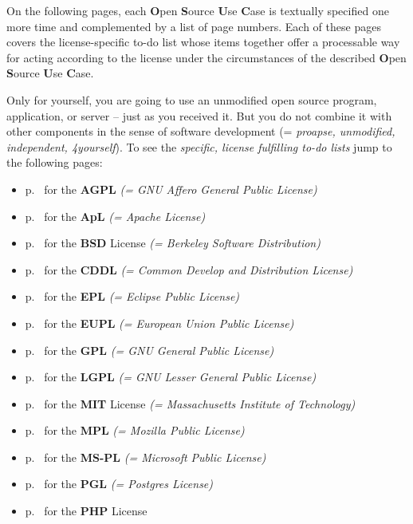On the following pages, each \textbf{O}pen \textbf{S}ource \textbf{U}se
\textbf{C}ase is textually specified one more time and complemented by a list of
page numbers. Each of these pages covers the license-specific to-do list whose
items together offer a processable way for acting according to the license under
the circumstances of the described \textbf{O}pen \textbf{S}ource \textbf{U}se
\textbf{C}ase.

\begin{description}
\label{OSUCList}
\item[OSUC-01:]\label{OSUC-01-DEF}
Only for yourself, you are going to use an unmodified open source program,
application, or server -- just as you received it. But you do not combine it
with other components in the sense of software development (= \textit{proapse,
unmodified, independent, 4yourself}).
To see the \textit{specific, license fulfilling to-do lists} jump to the
following pages:
  \begin{itemize}
    \item p.\ \pageref{OSUC-01-AGPL} for the \textbf{AGPL}
      \textit{(= GNU Affero General Public License)} 
    \item p.\ \pageref{OSUC-01-Apache20} for the \textbf{ApL}
      \textit{(= Apache License)}
    \item p.\ \pageref{OSUC-01-BSD} for the \textbf{BSD} License
      \textit{(= Berkeley Software Distribution)}
    \item p.\ \pageref{OSUC-01-CDDL} for the \textbf{CDDL}
      \textit{(= Common Develop and Distribution License)}  
    \item p.\ \pageref{OSUC-01-EPL} for the \textbf{EPL}
      \textit{(= Eclipse Public License)}     
    \item p.\ \pageref{OSUC-01-EUPL} for the \textbf{EUPL}
      \textit{(= European Union Public License)} 
    \item p.\ \pageref{OSUC-01-GPL} for the \textbf{GPL}
       \textit{(= GNU General Public License)} 
    \item p.\ \pageref{OSUC-01-LGPL} for the \textbf{LGPL}
      \textit{(= GNU Lesser General Public License)}           
    \item p.\ \pageref{OSUC-01-MIT} for the \textbf{MIT} License
       \textit{(= Massachusetts Institute of Technology)} 
    \item p.\ \pageref{OSUC-01-MPL} for the \textbf{MPL}
      \textit{(= Mozilla Public License)}     
    \item p.\ \pageref{OSUC-01-MS-PL} for the \textbf{MS-PL}
      \textit{(= Microsoft Public License)} 
    \item p.\ \pageref{OSUC-01-PGL} for the \textbf{PGL}
      \textit{(= Postgres License)} 
    \item p.\ \pageref{OSUC-01-PHP} for the \textbf{PHP} License 
  \end{itemize}


\end{description}
